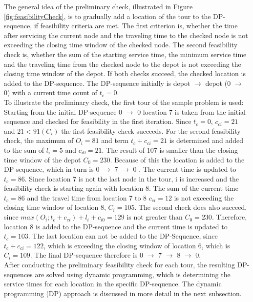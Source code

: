 \documentclass[final,5p,times,twocolumn]{elsarticle}
\begin{document}
{{The general idea of the preliminary check, illustrated in Figure \ref{fig:feasibilityCheck}, is to gradually add a location of the tour to the DP-sequence, if feasibility criteria are met. The first criterion is, whether the time after servicing the current node and the traveling time to the checked node is not exceeding the closing time window of the checked node. The second feasibility check is, whether the sum of the starting service time, the minimum service time and the traveling time from the checked node to the depot is not exceeding the closing time window of the depot. If both checks succeed, the checked location is added to the DP-sequence. The DP-sequence initially is depot $ \rightarrow$ depot (0 $ \rightarrow$ 0) with a current time count of $t_{c}=0$. \\
To illustrate the preliminary check, the first tour of the sample problem is used:\\
Starting from the initial DP-sequence 0 $ \rightarrow$ 0 location 7 is taken from the initial sequence and checked for feasibility in the first iteration. Since $t_{c}=0$, $c_{ci}=21$ and $21<91(C_{i})$ the first feasibility check succeeds. For the second feasibility check, the maximum of $O_{i}=81$ and term $t_{c}+c_{ci}=21$ is determined and added to the sum of $l_{i}=5$ and $c_{i0}=21$. The result of $107$ is smaller than the closing time window of the depot $C_{0}=230$. Because of this the location is added to the DP-sequence, which in turn is 0 $ \rightarrow$ 7 $ \rightarrow$ 0 . The current time is updated to $t_{c}=86$. Since location 7 is not the last node in the tour, i is increased and the feasibility check is starting again with location 8. The sum of the current time $t_{c}=86$ and the travel time from location 7 to 8 $c_{ci}=12$ is not exceeding the closing time window of location 8, $C_{i}=105$. The second check does also succeed, since $max(O_{i};t_{c}+c_{ci})+l_{i}+c_{i0}=129$ is not greater than $C_{0}=230$. Therefore, location 8 is added to the DP-sequence and the current time is updated to $t_{c}=103$. The last location can not be added to the DP-Sequence, since $t_{c}+c_{ci}=122$, which is exceeding the closing window of location 6, which is $C_{i}=109$. The final DP-sequence therefore is 0 $ \rightarrow$ 7 $ \rightarrow$ 8 $\rightarrow$  0. \\
After conducting the preliminary feasibility check for each tour, the resulting DP-sequences are solved using dynamic programming, which is determining the service times for each location in the specific DP-sequence. The dynamic programming (DP) approach is discussed in more detail in the next subsection.\\
}}
\end{document}
